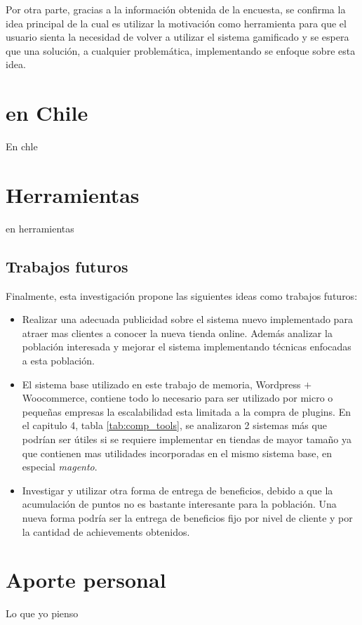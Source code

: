 Por otra parte, gracias a la información obtenida de la encuesta, se confirma la
idea principal de {\GAM} la cual es utilizar la motivación como herramienta para
que el usuario sienta la necesidad de volver a utilizar el sistema gamificado y
se espera que una solución, a cualquier problemática, implementando {\GAM} se
enfoque sobre esta idea.

\section{{\GAM} en Chile}

En chle

\section{Herramientas}

en herramientas

\subsection{Trabajos futuros}

Finalmente, esta investigación propone las siguientes ideas como trabajos futuros:


\begin{itemize}

\item Realizar una adecuada publicidad sobre el sistema nuevo implementado para
	atraer mas clientes a conocer la nueva tienda online. Además analizar
	la población interesada y mejorar el sistema implementando técnicas 
	enfocadas a esta población.

\item El sistema base utilizado en este trabajo de memoria, Wordpress $+$ Woocommerce, contiene
todo lo necesario para ser utilizado por micro o pequeñas empresas la escalabilidad esta limitada
a la compra de plugins. En el capitulo 4, tabla \ref{tab:comp_tools}, se analizaron 2 sistemas más
que podrían ser útiles si se requiere implementar {\GAM} en tiendas de mayor tamaño ya que contienen
mas utilidades incorporadas en el mismo sistema base, en especial \emph{magento}.

\item Investigar y utilizar otra forma de entrega de beneficios, debido a que la 
acumulación de puntos no es bastante interesante para la población. Una nueva forma podría ser la entrega 
de beneficios fijo por nivel de cliente y por la cantidad de achievements obtenidos.

\end{itemize}

\section{Aporte personal}

Lo que yo pienso
